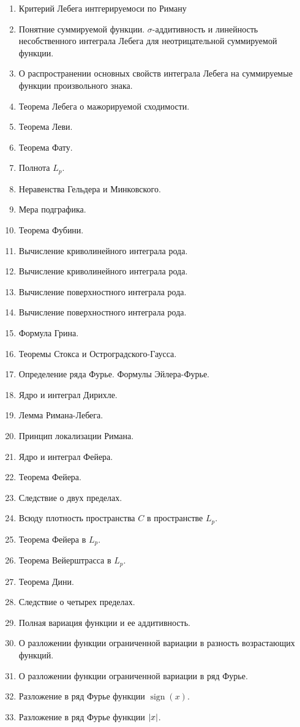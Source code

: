 \documentclass{article}
\DeclareMathOperator{\sign}{sign}
\begin{document}
\begin{enumerate} \setlength\itemsep{0em}
	\item Критерий Лебега интгерируемоси по Риману
	\item Понятние суммируемой функции. $\sigma$-аддитивность и линейность несобственного интеграла Лебега для неотрицательной суммируемой функции.
	\item О распространении основных свойств интеграла Лебега на суммируемые функции произвольного знака.
	\item Теорема Лебега о мажорируемой сходимости.
	\item Теорема Леви.
	\item Теорема Фату.
	\item Полнота $L_p$.
	\item Неравенства Гельдера и Минковского.
	\item Мера подграфика.
	\item Теорема Фубини.
	\item Вычисление криволинейного интеграла  рода.
	\item Вычисление криволинейного интеграла  рода.
	\item Вычисление поверхностного интеграла  рода.
	\item Вычисление поверхностного интеграла  рода.
	\item Формула Грина.
	\item Теоремы Стокса и Остроградского-Гаусса.
	\item Определение ряда Фурье. Формулы Эйлера-Фурье.
	\item Ядро и интеграл Дирихле.
	\item Лемма Римана-Лебега.
	\item Принцип локализации Римана.
	\item Ядро и интеграл Фейера.
	\item Теорема Фейера.
	\item Следствие о двух пределах.
	\item Всюду плотность пространства $C$ в пространстве $L_p$.
	\item Теорема Фейера в $L_p$.
	\item Теорема Вейерштрасса в $L_p$.
	\item Теорема Дини.
	\item Следствие о четырех пределах.
	\item Полная вариация функции и ее аддитивность.
	\item О разложении функции ограниченной вариации в разность возрастающих функций.
	\item О разложении функции ограниченной вариации в ряд Фурье.
	\item Разложение в ряд Фурье функции $\sign(x)$.
	\item Разложение в ряд Фурье функции $\left|x\right|$.
\end{enumerate}
\end{document}
